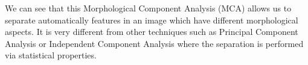 We can see that this Morphological Component Analysis (MCA) allows
us to separate automatically features in an image which have different
morphological aspects. It is very different from other techniques such as
Principal Component Analysis or 
Independent Component Analysis \cite{mc:cardoso98} where the separation
is performed via statistical properties.


\clearpage
\newpage
